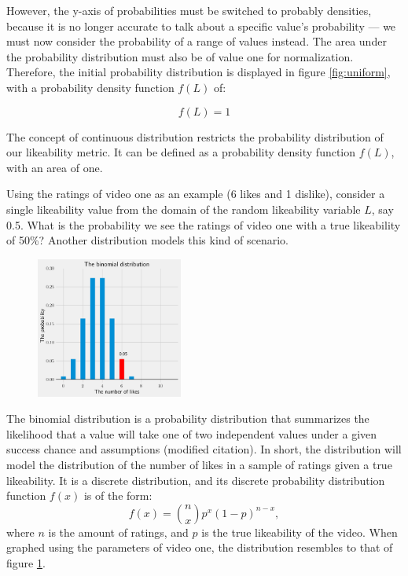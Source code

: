 \documentclass[a4paper,11pt]{article}
\begin{document}
However, the y-axis of probabilities must be switched to probably densities, because it is no longer accurate to talk about a specific value's probability --- we must now consider the probability of a range of values instead. The area under the probability distribution must also be of value one for normalization. Therefore, the initial probability distribution is displayed in figure \ref{fig:uniform}, with a probability density function $f(L)$ of:

\[
    f(L) = 1
\]

The concept of continuous distribution restricts the probability distribution of our likeability metric. It can be defined as a probability density function $f(L)$, with an area of one.

Using the ratings of video one as an example (6 likes and 1 dislike), consider a single likeability value from the domain of the random likeability variable $L$, say 0.5. What is the probability we see the ratings of video one with a true likeability of 50\%? Another distribution models this kind of scenario.

\begin{figure}
    \includegraphics[width=0.43\textwidth,right]{assets/bino_pdfs.png}
    \caption{}
    \label{fig:bino}
\end{figure}

The binomial distribution is a probability distribution that summarizes the likelihood that a value will take one of two independent values under a given success chance and assumptions (modified citation). In short, the distribution will model the distribution of the number of likes in a sample of ratings given a true likeability. It is a discrete distribution, and its discrete probability distribution function $f(x)$ is of the form:
\[
    f(x) = {n \choose x} p^x (1-p)^{n-x},
\]
where $n$ is the amount of ratings, and $p$ is the true likeability of the video. When graphed using the parameters of video one, the distribution resembles to that of figure \ref{fig:bino}.
\end{document}
